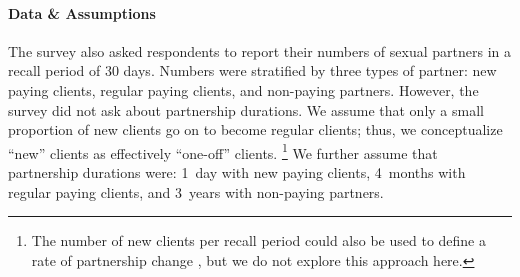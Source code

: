 \paragraph{Data \& Assumptions}
The survey \cite{Baral2014} also asked respondents to report
their numbers of sexual partners in a recall period of 30 days.
Numbers were stratified by three types of partner:
new paying clients, regular paying clients, and non-paying partners.
However, the survey did not ask about partnership durations.
We assume that only a small proportion of new clients go on to become regular clients;
thus, we conceptualize ``new'' clients as effectively ``one-off'' clients.%
\footnote{The number of new clients per recall period
  could also be used to define a rate of partnership change \cite{Fazito2012},
  but we do not explore this approach here.}
We further assume that partnership durations were:
1~day with new paying clients,
4~months with regular paying clients, and
3~years with non-paying partners.
